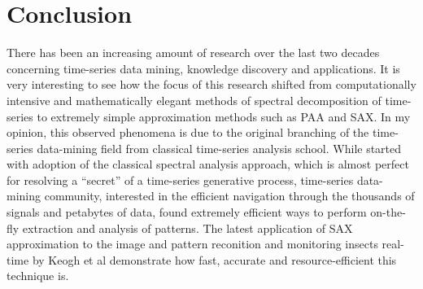 \chapter{Conclusion}
There has been an increasing amount of research over the last two decades concerning time-series data mining, knowledge discovery and applications. It is very interesting to see how the focus of this research shifted from computationally intensive and mathematically elegant methods of spectral decomposition of time-series to extremely simple approximation methods such as PAA and SAX. In my opinion, this observed phenomena is due to the original branching of the time-series data-mining field from classical time-series analysis school. While started with adoption of the classical spectral analysis approach, which is almost perfect for resolving a ``secret'' of a time-series generative process, time-series data-mining community, interested in the efficient navigation through the thousands of signals and petabytes of data, found extremely efficient ways to perform on-the-fly extraction and analysis of patterns. The latest application of SAX approximation to the image and pattern reconition \cite{citeulike:3175770} and monitoring insects real-time \cite{citeulike:4446167} by Keogh et al demonstrate how fast, accurate and resource-efficient this technique is. 